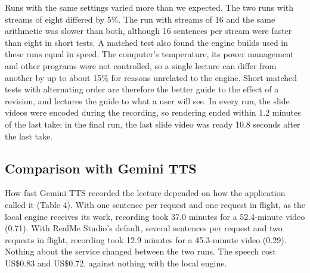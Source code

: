 \documentclass[11pt]{article}
\begin{document}
Runs with the same settings varied more than we expected. The two runs
with streams of eight differed by 5\%. The run with streams of 16 and
the same arithmetic was slower than both, although 16 sentences per
stream were faster than eight in short tests. A matched test also found
the engine builds used in these runs equal in speed. The computer's
temperature, its power management and other programs were not
controlled, so a single lecture can differ from another by up to about
15\% for reasons unrelated to the engine. Short matched tests with
alternating order are therefore the better guide to the effect of a
revision, and lectures the guide to what a user will see. In every run,
the slide videos were encoded during the recording, so rendering ended
within 1.2 minutes of the last take; in the final run, the last slide
video was ready 10.8 seconds after the last take.

\hypertarget{comparison-with-gemini-tts}{%
\subsection{Comparison with Gemini
TTS}\label{comparison-with-gemini-tts}}

How fast Gemini TTS recorded the lecture depended on how the application
called it (Table 4). With one sentence per request and one request in
flight, as the local engine receives its work, recording took 37.0
minutes for a 52.4-minute video (0.71). With RealMe Studio's default,
several sentences per request and two requests in flight, recording took
12.9 minutes for a 45.3-minute video (0.29). Nothing about the service
changed between the two runs. The speech cost US\$0.83 and US\$0.72,
against nothing with the local engine.
\end{document}
